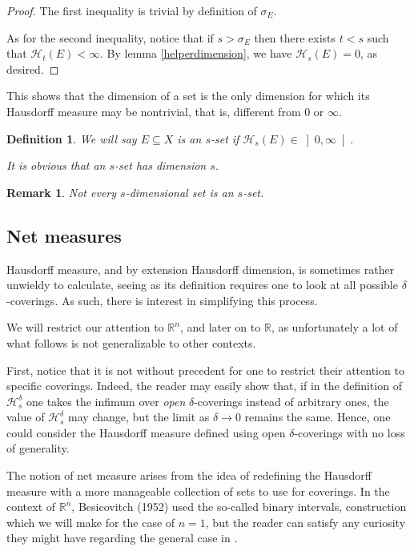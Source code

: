 \documentclass[11pt]{amsart}
\newcommand{\R}{\mathbb{R}}
\newcommand{\HH}{\mathcal{H}}
\newtheorem{definition}{Definition}
\newtheorem{remark}{Remark}
\begin{document}
\begin{proof}
The first inequality is trivial by definition of $\sigma_E$.

As for the second inequality, notice that if $s > \sigma_E$ then there exists $t < s$ such that $\HH_t(E) < \infty$. By lemma \ref{helperdimension}, we have $\HH_s(E) = 0$, as desired.
\end{proof}

This shows that the dimension of a set is the only dimension for which its Hausdorff measure may be nontrivial, that is, different from $0$ or $\infty$.

\begin{definition}
We will say $E \subseteq X$ is an \emph{$s$-set} if $\HH_s(E) \in \left]0, \infty \right[$.

It is obvious that an $s$-set has dimension $s$.
\end{definition}

\begin{remark}
Not every $s$-dimensional set is an $s$-set.
\end{remark}

\subsection{Net measures}

Hausdorff measure, and by extension Hausdorff dimension, is sometimes rather unwieldy to calculate, seeing as its definition requires one to look at all possible $\delta$-coverings. As such, there is interest in simplifying this process.

We will restrict our attention to $\R^n$, and later on to $\R$, as unfortunately a lot of what follows is not generalizable to other contexts.

First, notice that it is not without precedent for one to restrict their attention to specific coverings. Indeed, the reader may easily show that, if in the definition of $\HH_s^\delta$ one takes the infimum over \emph{open} $\delta$-coverings instead of arbitrary ones, the value of $\HH_s^\delta$ may change, but the limit as $\delta \to 0$ remains the same. Hence, one could consider the Hausdorff measure defined using open $\delta$-coverings with no loss of generality.

The notion of net measure arises from the idea of redefining the Hausdorff measure with a more manageable collection of sets to use for coverings. In the context of $\R^n$, Besicovitch (1952) used the so-called binary intervals, construction which we will make for the case of $n = 1$, but the reader can satisfy any curiosity they might have regarding the general case in \cite{falconer} \cite{rogers}.
\end{document}
